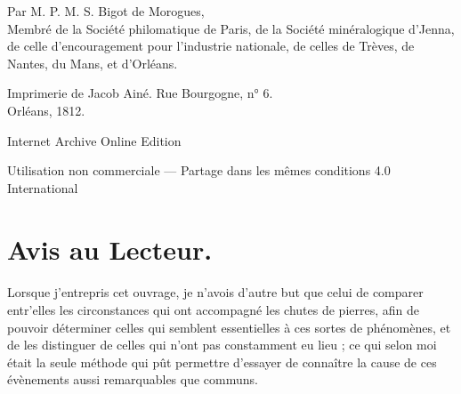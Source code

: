 \documentclass[a4paper, 12pt, oneside, french]{article}
\begin{document}
\begin{titlepage}
	\vspace{1\baselineskip} %
	
	
	{Par M. P. M. S. Bigot de Morogues,\\ \footnotesize{Membré de la Société philomatique de Paris, de la Société minéralogique d'Jenna, de celle d'encouragement pour l'industrie nationale, de celles de Trèves, de Nantes, du Mans, et d'Orléans.}} %
	
	\vspace*{1\baselineskip} %
	
    \vspace*{\fill}

	{\small\scshape }

    {Imprimerie de Jacob Ainé. Rue Bourgogne, n° 6.\\ Orléans, 1812.} %
    
    Internet Archive Online Edition  %
	
	{Utilisation non commerciale --- Partage dans les mêmes conditions 4.0 International} %
\end{titlepage}
\setlength{\parskip}{1mm plus1mm minus1mm}
\clearpage
\frenchspacing
\tableofcontents
\clearpage
\Large
\pagestyle{fancy}
\fancyhf{}
\cfoot{\Fontauri{\thepage}}
\section*{Avis au Lecteur.}
\paragraph{}
Lorsque j'entrepris cet ouvrage, je n'avois d'autre but que celui de comparer entr’elles les circonstances qui ont accompagné les chutes de pierres, afin de pouvoir déterminer celles qui semblent essentielles à ces sortes de phénomènes, et de les distinguer de celles qui n'ont pas constamment eu lieu ; ce qui selon moi était la seule méthode qui pût permettre d'essayer de connaître la cause de ces évènements aussi remarquables que communs.
\end{document}
